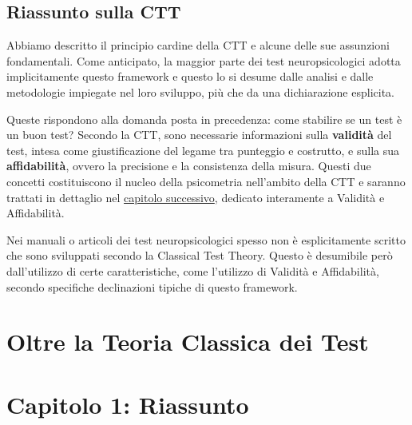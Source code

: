 \documentclass[
  italian,
  letterpaper,
  paper=6in:9in,
  pagesize=pdftex,
  headinclude=on,
  footinclude=on,
  11pt]{scrbook}
\begin{document}
\subsection{\texorpdfstring{Riassunto sulla CTT
}{Riassunto sulla CTT }}\label{riassunto-sulla-ctt}

Abbiamo descritto il principio cardine della CTT e alcune delle sue
assunzioni fondamentali. Come anticipato, la maggior parte dei test
neuropsicologici adotta implicitamente questo framework e questo lo si
desume dalle analisi e dalle metodologie impiegate nel loro sviluppo,
più che da una dichiarazione esplicita.

Queste rispondono alla domanda posta in precedenza: come stabilire se un
test è un buon test? Secondo la CTT, sono necessarie informazioni sulla
\textbf{validità} del test, intesa come giustificazione del legame tra
punteggio e costrutto, e sulla sua \textbf{affidabilità}, ovvero la
precisione e la consistenza della misura. Questi due concetti
costituiscono il nucleo della psicometria nell'ambito della CTT e
saranno trattati in dettaglio nel
\hyperref[validita-e-affidabilita]{capitolo successivo}, dedicato
interamente a Validità e Affidabilità.

\begin{tcolorbox}[enhanced jigsaw, title=\textcolor{quarto-callout-tip-color}{\faLightbulb}\hspace{0.5em}{Nota}, coltitle=black, bottomtitle=1mm, colback=white, bottomrule=.15mm, rightrule=.15mm, breakable, toptitle=1mm, left=2mm, colbacktitle=quarto-callout-tip-color!10!white, titlerule=0mm, colframe=quarto-callout-tip-color-frame, leftrule=.75mm, opacitybacktitle=0.6, arc=.35mm, toprule=.15mm, opacityback=0]

Nei manuali o articoli dei test neuropsicologici spesso non è
esplicitamente scritto che sono sviluppati secondo la Classical Test
Theory. Questo è desumibile però dall'utilizzo di certe caratteristiche,
come l'utilizzo di Validità e Affidabilità, secondo specifiche
declinazioni tipiche di questo framework.

\end{tcolorbox}

\section{Oltre la Teoria Classica dei
Test}\label{oltre-la-teoria-classica-dei-test}

\section{Capitolo 1: Riassunto}\label{capitolo-1-riassunto}
\end{document}
